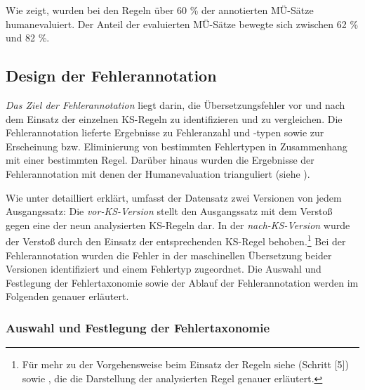 Wie  zeigt, wurden bei den Regeln über 60 \% der annotierten MÜ-Sätze humanevaluiert. Der Anteil der evaluierten MÜ-Sätze bewegte sich zwischen 62 \% und 82 \%.

\subsection{Design der Fehlerannotation}
\label{sec:4.4.4}
\textit{Das Ziel der Fehlerannotation} liegt darin, die Übersetzungsfehler vor und nach dem Einsatz der einzelnen KS-Regeln zu identifizieren und zu vergleichen. Die Fehlerannotation lieferte Ergebnisse zu Fehleranzahl und -typen sowie zur Erscheinung bzw. Eliminierung von bestimmten Fehlertypen in Zusammenhang mit einer bestimmten Regel. Darüber hinaus wurden die Ergebnisse der Fehlerannotation mit denen der Humanevaluation trianguliert (siehe ).

Wie unter  detailliert erklärt, umfasst der Datensatz zwei Versionen von jedem Ausgangssatz: Die \textit{vor-KS-Version} stellt den Ausgangssatz mit dem Verstoß gegen eine der neun analysierten KS-Regeln dar. In der \textit{nach-KS-Version} wurde der Verstoß durch den Einsatz der entsprechenden KS-Regel behoben.\footnote{Für
    mehr zu der Vorgehensweise beim Einsatz der Regeln siehe  (Schritt [5]) sowie , die die Darstellung der analysierten Regel genauer erläutert.
} Bei der Fehlerannotation wurden die Fehler in der maschinellen Übersetzung beider Versionen identifiziert und einem Fehlertyp zugeordnet. Die Auswahl und Festlegung der Fehlertaxonomie sowie der Ablauf der Fehlerannotation werden im Folgenden genauer erläutert.

\subsubsection{\label{sec:4.4.4.1} Auswahl und Festlegung der Fehlertaxonomie}

